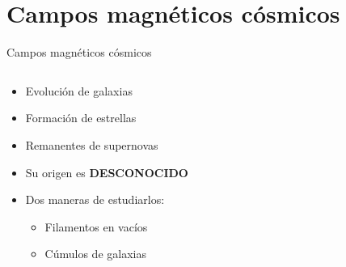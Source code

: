 \documentclass[xetex,aspectratio=169]{beamer}
\begin{document}
	\section{Campos magnéticos cósmicos}
	\begin{frame}{Campos magnéticos cósmicos}
		\begin{columns}
			
			\begin{column}{0.48\textwidth}
				\begin{itemize}
					\item Evolución de galaxias
					\item Formación de estrellas
					\item Remanentes de supernovas
					\item Su origen es \alert{\textbf{DESCONOCIDO}}
				\end{itemize}
				\begin{itemize}
					\item Dos maneras de estudiarlos:
					\begin{itemize}
						\item Filamentos en vacíos
						\item Cúmulos de galaxias
					\end{itemize}
				\end{itemize}
			\end{column}
			
			\begin{column}{0.48\textwidth}
				
				
			\end{column}
		\end{columns}
	\end{frame}
	
\end{document}
